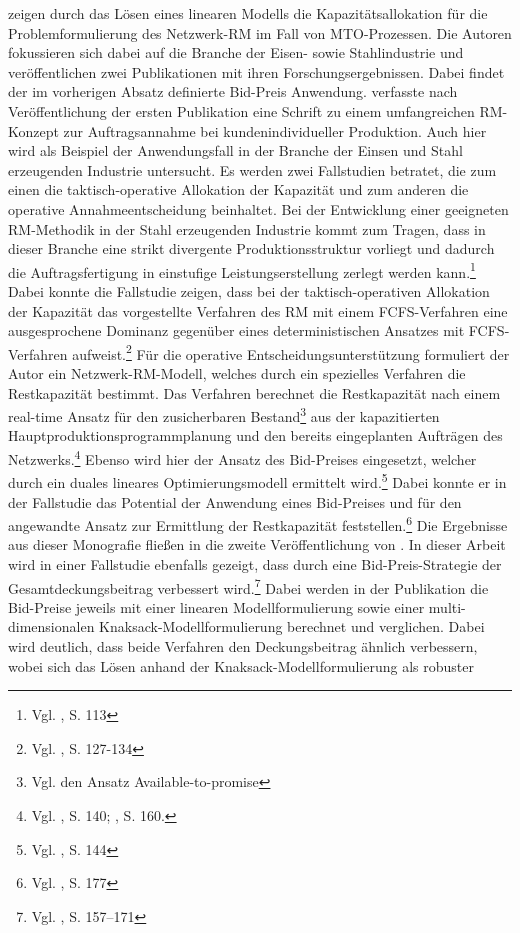 
\cite{rehkopf:2005aa} zeigen durch das Lösen eines linearen Modells die Kapazitätsallokation für die Problemformulierung des Netzwerk-RM im Fall von MTO-Prozessen. Die Autoren fokussieren sich dabei auf die Branche der Eisen- sowie Stahlindustrie und veröffentlichen zwei Publikationen mit ihren Forschungsergebnissen. Dabei findet der im vorherigen Absatz definierte Bid-Preis Anwendung. \cite{rehkopf2007revenue} verfasste nach Veröffentlichung der ersten Publikation eine Schrift zu einem umfangreichen RM-Konzept zur Auftragsannahme bei kundenindividueller Produktion. Auch hier wird als Beispiel der Anwendungsfall in der Branche der Einsen und Stahl erzeugenden Industrie untersucht. Es werden zwei Fallstudien betratet, die zum einen die taktisch-operative Allokation der Kapazität und zum anderen die operative Annahmeentscheidung beinhaltet. Bei der Entwicklung einer geeigneten RM-Methodik in der Stahl erzeugenden Industrie kommt zum Tragen, dass in dieser Branche eine strikt divergente Produktionsstruktur vorliegt und dadurch die Auftragsfertigung in einstufige Leistungserstellung zerlegt werden kann.\footnote{Vgl. \cite{rehkopf2007revenue}, S. 113} Dabei konnte die Fallstudie zeigen, dass bei der taktisch-operativen Allokation der Kapazität das vorgestellte Verfahren des RM mit einem FCFS-Verfahren eine ausgesprochene Dominanz gegenüber eines deterministischen Ansatzes mit FCFS-Verfahren aufweist.\footnote{Vgl. \cite{rehkopf2007revenue}, S. 127-134} Für die operative Entscheidungsunterstützung formuliert der Autor ein Netzwerk-RM-Modell, welches durch ein spezielles Verfahren die Restkapazität bestimmt. Das Verfahren berechnet die Restkapazität nach einem real-time Ansatz für den zusicherbaren Bestand\footnote{Vgl. den Ansatz \glqq Available-to-promise\grqq} aus der kapazitierten Hauptproduktionsprogrammplanung und den bereits eingeplanten Aufträgen des Netzwerks.\footnote{Vgl. \cite{rehkopf2007revenue}, S. 140; \cite{Spengler:2007aa}, S. 160.} Ebenso wird hier der Ansatz des Bid-Preises eingesetzt, welcher durch ein duales lineares Optimierungsmodell ermittelt wird.\footnote{Vgl. \cite{rehkopf2007revenue}, S. 144} Dabei konnte er in der Fallstudie das Potential der Anwendung eines Bid-Preises und für den angewandte Ansatz zur Ermittlung der Restkapazität feststellen.\footnote{Vgl. \cite{rehkopf2007revenue}, S. 177} Die Ergebnisse aus dieser Monografie fließen in die zweite Veröffentlichung von \cite{Spengler:2007aa}. In dieser Arbeit wird in einer Fallstudie ebenfalls gezeigt, dass durch eine Bid-Preis-Strategie der Gesamtdeckungsbeitrag verbessert wird.\footnote{Vgl. \cite{Spengler:2007aa}, S. 157–171} Dabei werden in der Publikation die Bid-Preise jeweils mit einer linearen Modellformulierung sowie einer multi-dimensionalen Knaksack-Modell\-for\-mu\-lier\-ung berechnet und verglichen. Dabei wird deutlich, dass beide Verfahren den Deckungsbeitrag ähnlich verbessern, wobei sich das Lösen anhand der Knaksack-Modell\-for\-mu\-lier\-ung als robuster 